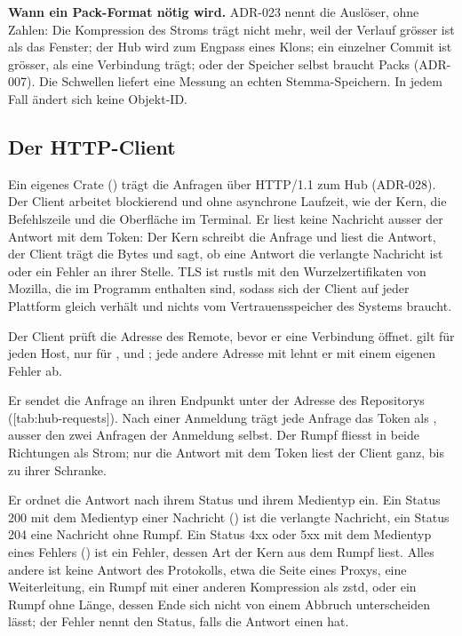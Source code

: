\startinfobox
{\bf Wann ein Pack-Format nötig wird.}
ADR-023 nennt die Auslöser, ohne Zahlen: Die Kompression des Stroms trägt nicht mehr, weil der
Verlauf grösser ist als das Fenster; der Hub wird zum Engpass eines Klons; ein einzelner Commit ist
grösser, als eine Verbindung trägt; oder der Speicher selbst braucht Packs (ADR-007).
Die Schwellen liefert eine Messung an echten Stemma-Speichern.
In jedem Fall ändert sich keine Objekt-ID.
\stopinfobox

\subsection[sec:http-client]{Der HTTP-Client}

Ein eigenes Crate () trägt die Anfragen über HTTP/1.1 zum Hub (ADR-028).
Der Client arbeitet blockierend und ohne asynchrone Laufzeit, wie der Kern, die Befehlszeile und
die Oberfläche im Terminal.
Er liest keine Nachricht ausser der Antwort mit dem Token: Der Kern schreibt die Anfrage und
liest die Antwort, der Client trägt die Bytes und sagt, ob eine Antwort die verlangte Nachricht
ist oder ein Fehler an ihrer Stelle.
TLS ist rustls mit den Wurzelzertifikaten von Mozilla, die im Programm enthalten sind, sodass sich
der Client auf jeder Plattform gleich verhält und nichts vom Vertrauensspeicher des Systems
braucht.

\startitemize[n]
\item Der Client prüft die Adresse des Remote, bevor er eine Verbindung öffnet.
 gilt für jeden Host,  nur für ,  und
; jede andere Adresse mit  lehnt er mit einem eigenen Fehler ab.
\item Er sendet die Anfrage an ihren Endpunkt unter der Adresse des Repositorys
([tab:hub-requests]).
Nach einer Anmeldung trägt jede Anfrage das Token als , ausser den
zwei Anfragen der Anmeldung selbst.
Der Rumpf fliesst in beide Richtungen als Strom; nur die Antwort mit dem Token liest der Client
ganz, bis zu ihrer Schranke.
\item Er ordnet die Antwort nach ihrem Status und ihrem Medientyp ein.
Ein Status 200 mit dem Medientyp einer Nachricht () ist die
verlangte Nachricht, ein Status 204 eine Nachricht ohne Rumpf.
Ein Status 4xx oder 5xx mit dem Medientyp eines Fehlers ()
ist ein Fehler, dessen Art der Kern aus dem Rumpf liest.
Alles andere ist keine Antwort des Protokolls, etwa die Seite eines Proxys, eine Weiterleitung,
ein Rumpf mit einer anderen Kompression als zstd, oder ein Rumpf ohne Länge, dessen
Ende sich nicht von einem Abbruch unterscheiden lässt; der Fehler nennt den Status, falls die
Antwort einen hat.
\stopitemize

